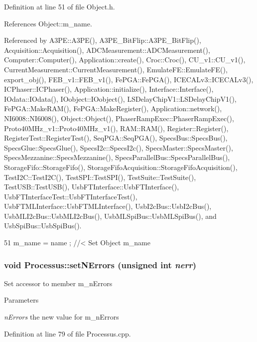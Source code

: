 Definition at line 51 of file Object.h.

References Object::m\_\-name.

Referenced by A3PE::A3PE(), A3PE\_\-BitFlip::A3PE\_\-BitFlip(), Acquisition::Acquisition(), ADCMeasurement::ADCMeasurement(), Computer::Computer(), Application::create(), Croc::Croc(), CU\_\-v1::CU\_\-v1(), CurrentMeasurement::CurrentMeasurement(), EmulateFE::EmulateFE(), export\_\-obj(), FEB\_\-v1::FEB\_\-v1(), FePGA::FePGA(), ICECALv3::ICECALv3(), ICPhaser::ICPhaser(), Application::initialize(), Interface::Interface(), IOdata::IOdata(), IOobject::IOobject(), LSDelayChipV1::LSDelayChipV1(), FePGA::MakeRAM(), FePGA::MakeRegister(), Application::network(), NI6008::NI6008(), Object::Object(), PhaserRampExec::PhaserRampExec(), Proto40MHz\_\-v1::Proto40MHz\_\-v1(), RAM::RAM(), Register::Register(), RegisterTest::RegisterTest(), SeqPGA::SeqPGA(), SpecsBus::SpecsBus(), SpecsGlue::SpecsGlue(), SpecsI2c::SpecsI2c(), SpecsMaster::SpecsMaster(), SpecsMezzanine::SpecsMezzanine(), SpecsParallelBus::SpecsParallelBus(), StorageFifo::StorageFifo(), StorageFifoAcquisition::StorageFifoAcquisition(), TestI2C::TestI2C(), TestSPI::TestSPI(), TestSuite::TestSuite(), TestUSB::TestUSB(), UsbFTInterface::UsbFTInterface(), UsbFTInterfaceTest::UsbFTInterfaceTest(), UsbFTMLInterface::UsbFTMLInterface(), UsbI2cBus::UsbI2cBus(), UsbMLI2cBus::UsbMLI2cBus(), UsbMLSpiBus::UsbMLSpiBus(), and UsbSpiBus::UsbSpiBus().


\begin{DoxyCode}
51 { m_name  = name  ; } //< Set Object m_name
\end{DoxyCode}
\hypertarget{classProcessus_a831b027b9cf18ab56fa6147b5d3055da}{
\subsubsection[{setNErrors}]{\setlength{\rightskip}{0pt plus 5cm}void Processus::setNErrors (unsigned int {\em nerr})}}
\label{classProcessus_a831b027b9cf18ab56fa6147b5d3055da}
Set accessor to member m\_\-nErrors 
\begin{DoxyParams}{Parameters}
\item[{\em nErrors}]the new value for m\_\-nErrors \end{DoxyParams}


Definition at line 79 of file Processus.cpp.

